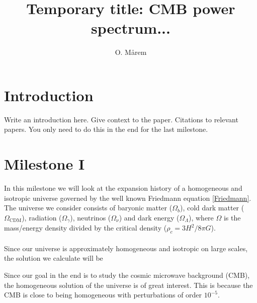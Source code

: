 \documentclass{aa}
\begin{document}
 

   \title{Temporary title: CMB power spectrum...}

   \author{O. Mårem}


   \date{}



   \maketitle

\section{Introduction}
Write an introduction here. Give context to the paper. Citations to relevant papers. You only need to do this in the end for the last milestone.

\section{Milestone I}
In this milestone we will look at the expansion history of a homogeneous and isotropic universe governed by the well known Friedmann equation \ref{Friedmann}.
The universe we consider consists of baryonic matter ($\Omega_b$), cold dark matter ($\Omega_\mathrm{CDM}$), radiation ($\Omega_\gamma$), neutrinos ($\Omega_\nu$)
and dark energy ($\Omega_\Lambda$), where $\Omega$ is the mass/energy density divided by the critical density ($\rho_c = 3H^2/8\pi G$).\\
\\
Since our universe is approximately homogeneous and isotropic on large scales, the solution we calculate will be  



Since our goal in the end is to study the
cosmic microwave background (CMB), the homogeneous solution of the universe is of great interest. This is because the CMB is close to
being homogeneous with perturbations of order $10^{-5}$.
     
\end{document}

